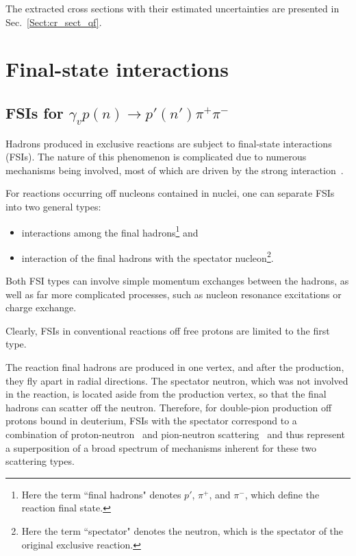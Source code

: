 \documentclass[prc,twocolumn,superscriptaddress,showpacs,amssymb,amsmath,amsfonts,aps,nofootinbib]{revtex4-1}
\begin{document}
The extracted cross sections with their estimated uncertainties are presented in Sec.\!~\ref{Sect:cr_sect_qf}.


\section{Final-state interactions}
\label{Sect:discuss_fsi}

\subsection{FSIs for $\gamma_{v}p(n) \rightarrow p' (n')\pi^{+}\pi^{-}$}
\label{Sect:intro_fsi}

Hadrons produced in exclusive reactions are subject to final-state interactions (FSIs). The nature of this phenomenon is complicated due to numerous mechanisms being involved, most of which are driven by the strong interaction~\cite{Darwish:2002qu,PhysRevC.84.035203}. 

For reactions occurring off nucleons contained in nuclei, one can separate FSIs into two general types:

\begin{itemize}
\item interactions among the final hadrons\footnote[3]{Here the term ``final hadrons" denotes $p'$, $\pi^{+}$, and $\pi^{-}$, which define the reaction final state.} and
\item interaction of the final hadrons with the spectator nucleon\footnote[4]{Here the term ``spectator" denotes the neutron, which is the spectator of the original exclusive reaction.}.
\end{itemize}


Both FSI types can involve simple momentum exchanges between the hadrons, as well as far more complicated processes, such as nucleon resonance excitations or charge exchange.

Clearly, FSIs in conventional reactions off free protons are limited to the first type.

The reaction final hadrons are produced in one vertex, and after the production, they fly apart in radial directions.  The spectator neutron, which was not involved in the reaction, is located aside from the production vertex, so that the final hadrons can scatter off the neutron. Therefore, for double-pion production off protons bound in deuterium, FSIs with the spectator correspond to a combination of proton-neutron~\cite{Shirokov_Yudin:1980,PhysRev.75.705} and pion-neutron scattering~\cite{PhysRevD.20.2804,Gasparyan:2003fp,Vrana:1999nt} and thus represent a superposition of a broad spectrum of mechanisms inherent for these two scattering types. 
\end{document}
